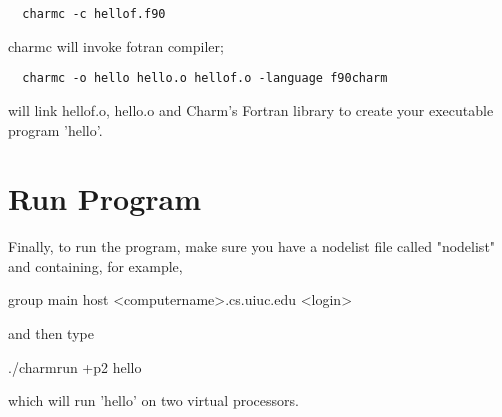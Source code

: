 \documentclass[11pt]{article}
\begin{document}
\begin{verbatim}
  charmc -c hellof.f90
\end{verbatim}
    charmc will invoke fotran compiler;

\begin{verbatim}
  charmc -o hello hello.o hellof.o -language f90charm
\end{verbatim}
    will link hellof.o, hello.o and Charm's Fortran library
    to create your executable program 'hello'.

\section{Run Program}

Finally, to run the program, make sure you have a nodelist file called
"nodelist" and containing, for example,

group main
host <computername>.cs.uiuc.edu <login>

and then type

./charmrun +p2 hello

which will run 'hello' on two virtual processors.
\end{document}
